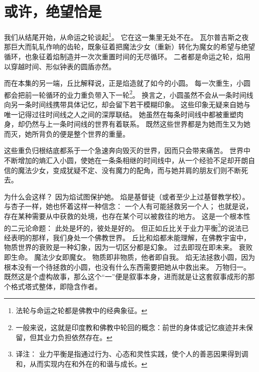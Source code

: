 \chapter[或许，绝望恰是]{或许，绝望恰是}



我们从结尾开始，从命运之轮谈起\footnote{%
    法轮与命运之轮都是佛教中的经典象征。
}\cite{ref62}。
它在这一集里无处不在。
瓦尔普吉斯之夜那巨大而轧轧作响的齿轮，既象征着把魔法少女（重新）转化为魔女的希望与绝望循环，也象征着焰制造并一次次重置时间的无尽循环。
二者都是命运之轮，焰用以穿越时间、形似钟表的圆盾亦然。

而在本集的另一端，丘比解释说，正是焰造就了如今的小圆。
每一次重生，小圆都会把前一轮循环的业力重负带入下一轮\footnote{%
    一般来说，这就是印度教和佛教中轮回的概念：前世的身体或记忆痕迹并未保留，但其业力负担依然存在。
}\cite{ref65}。
换言之，小圆虽然不会从一条时间线向另一条时间线携带具体记忆，却会留下若干模糊印象。
这些印象无疑来自她与唯一记得过往时间线之人之间的深厚联结。
她虽然在每条时间线中都被重塑肉身，却仍然与上一条时间线的世界有着联系。
既然这些世界都是为她而生又为她而灭，她所背负的便是整个世界的重量。

这些重负归根结底都系于一个急速奔向毁灭的世界，因而只会带来痛苦\cite{ref62}。
世界中不断增加的熵汇入小圆，使她在一条条相继的时间线中，从一个经验不足却开朗自信的魔法少女，变成犹疑不定、没有魔力的配角，而与她并肩的朋友们则不断死去。

为什么会这样？
因为焰试图保护她。
焰是基督徒（或者至少上过基督教学校）。
与杏子一样，她也怀着这样一种信念：
一个人有可能拯救另一个人；
也就是说，存在某种需要从中获救的处境，也存在某个可以被救往的地方。
这是一个根本性的二元论命题：
此处是坏的，彼处是好的。
但正如丘比关于业力平衡\footnote{%
    译注：
    业力平衡是指通过行为、心态和灵性实践，使个人的善恶因果得到调和，从而实现内在和外在的和谐与成长。
}的说法已经表明的那样，我们身处一个佛教世界。
丘比和焰都未能理解，在佛教宇宙中，物质世界的衰败是一种幻象，因为一切区分都是幻象\cite{ref63}。
过去即现在即未来。
衰败即生命。
魔法少女即魔女。
物质即非物质，他者即自我。
焰无法拯救小圆，因为根本没有一个待拯救的小圆，也没有什么东西需要把她从中救出来。
万物归一。
既然这是个虚构故事，那么这个“一”便是叙事本身，进而就是让这套叙事成形的那个格式塔式整体，即隐含作者。

